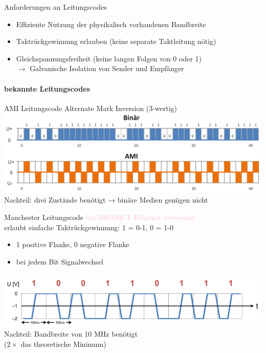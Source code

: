 \begin{KR}{Anforderungen an Leitungscodes}
\begin{itemize}
    \item Effiziente Nutzung der physikalisch vorhandenen Bandbreite
    \item Taktrückgewinnung erlauben (keine separate Taktleitung nötig)
    \item Gleichspannungsfreiheit (keine langen Folgen von 0 oder 1) \\ $\rightarrow$ Galvanische Isolation von Sender und Empfänger
\end{itemize} 
\end{KR}

\paragraph{bekannte Leitungscodes}

\begin{concept}{AMI Leitungscode} Alternate Mark Inversion (3-wertig)\\
    \includegraphics[width=0.7\linewidth]{images/gleichspannungsfreiheit.png}\\
    Nachteil: drei Zustände benötigt → binäre Medien genügen nicht
\end{concept}

\begin{concept}{Manchester Leitungscode} \textcolor{pink}{bei 10BASE-T Ethernet verwendet}\\
    erlaubt einfache Taktrückgewinnung: 1 = 0-1, 0 = 1-0
    \begin{itemize}
        \item 1 positive Flanke, 0 negative Flanke
        \item bei jedem Bit Signalwechsel
    \end{itemize}
    \includegraphics[width=0.6\linewidth]{images/leitungscode.png}\\
    Nachteil: Bandbreite von 10 MHz benötigt \\ ($2 \times$ das theoretische Minimum)
\end{concept}

